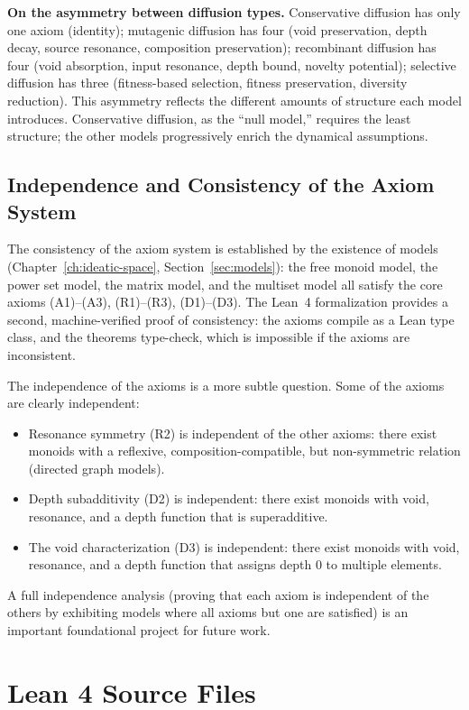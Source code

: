 \documentclass[11pt,openany]{book}
\theoremstyle{definition}
\theoremstyle{plain}
\theoremstyle{remark}
\begin{document}
\textbf{On the asymmetry between diffusion types.} Conservative diffusion has only one axiom (identity); mutagenic diffusion has four (void preservation, depth decay, source resonance, composition preservation); recombinant diffusion has four (void absorption, input resonance, depth bound, novelty potential); selective diffusion has three (fitness-based selection, fitness preservation, diversity reduction). This asymmetry reflects the different amounts of structure each model introduces. Conservative diffusion, as the ``null model,'' requires the least structure; the other models progressively enrich the dynamical assumptions.

\section{Independence and Consistency of the Axiom System}

The consistency of the axiom system is established by the existence of models (Chapter~\ref{ch:ideatic-space}, Section~\ref{sec:models}): the free monoid model, the power set model, the matrix model, and the multiset model all satisfy the core axioms (A1)--(A3), (R1)--(R3), (D1)--(D3). The Lean~4 formalization provides a second, machine-verified proof of consistency: the axioms compile as a Lean type class, and the theorems type-check, which is impossible if the axioms are inconsistent.

The independence of the axioms is a more subtle question. Some of the axioms are clearly independent:
\begin{itemize}
\item Resonance symmetry (R2) is independent of the other axioms: there exist monoids with a reflexive, composition-compatible, but non-symmetric relation (directed graph models).
\item Depth subadditivity (D2) is independent: there exist monoids with void, resonance, and a depth function that is superadditive.
\item The void characterization (D3) is independent: there exist monoids with void, resonance, and a depth function that assigns depth 0 to multiple elements.
\end{itemize}

A full independence analysis (proving that each axiom is independent of the others by exhibiting models where all axioms but one are satisfied) is an important foundational project for future work.

\chapter{Lean 4 Source Files}
\label{app:lean}
\end{document}
